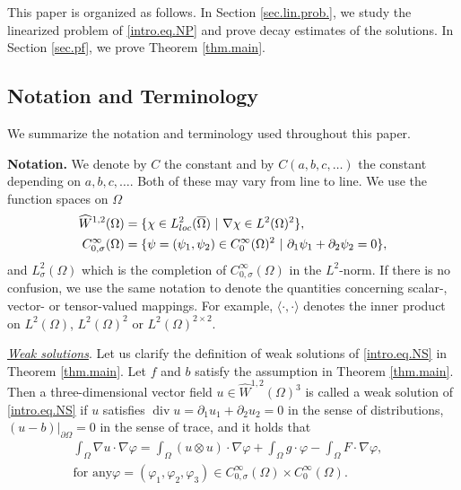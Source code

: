 \documentclass[11pt,a4paper]{article}
\numberwithin{equation}{section}
\newcommand{\opdiv}{\operatorname{div}}
\begin{document}
This paper is organized as follows. In Section \ref{sec.lin.prob.}, we study the linearized problem of \eqref{intro.eq.NP} and prove decay estimates of the solutions. In Section \ref{sec.pf}, we prove Theorem \ref{thm.main}. 


\subsection*{Notation and Terminology}
\label{subsec.sec.intro}


We summarize the notation and terminology used throughout this paper.


\smallskip


\noindent
{\bf Notation.} We denote by $C$ the constant and by $C(a,b,c,\ldots)$ the constant depending on $a,b,c,\ldots$. Both of these may vary from line to line. We use the function spaces on $\Omega$
%
\begin{align*}
\widehat{W}^{1,2}(\Omega)
&=\{\chi\in L^2_{{\rm loc}}(\overline{\Omega})~|~\nabla \chi\in L^2(\Omega)^2\}, \\
C^\infty_{0,\sigma}(\Omega)
&=\{\psi=(\psi_1, \psi_2)\in C^\infty_0(\Omega)^2~|~\partial_1 \psi_1 + \partial_2 \psi_2=0\},
\end{align*}
%
and $L^2_{\sigma}(\Omega)$ which is the completion of $C^\infty_{0,\sigma}(\Omega)$ in the $L^2$-norm. If there is no confusion, we use the same notation to denote the quantities concerning scalar-, vector- or tensor-valued mappings. For example, $\langle \cdot, \cdot\rangle$ denotes the inner product on $L^2(\Omega)$, $L^2(\Omega)^2$ or $L^2(\Omega)^{2\times2}$. 


\smallskip


\noindent
\underline{{\it Weak solutions}}. 
Let us clarify the definition of weak solutions of \eqref{intro.eq.NS} 
in Theorem \ref{thm.main}. Let $f$ and $b$ satisfy the assumption in Theorem \ref{thm.main}. Then a three-dimensional vector field $u\in \widehat{W}^{1,2}(\Omega)^3$ is called a weak solution of \eqref{intro.eq.NS} if $u$ satisfies $\opdiv u=\partial_1 u_1 + \partial_2 u_2=0$ in the sense of distributions, $(u-b)|_{\partial\Omega}=0$ in the sense of trace, and it holds that 
%
\begin{align*}
\int_\Omega \nabla u \cdot \nabla \varphi 
= \int_\Omega (u\otimes u) \cdot \nabla \varphi 
+ \int_\Omega g \cdot \varphi 
- \int_\Omega F \cdot \nabla \varphi, &\\
\text{
for any
$\varphi
=(\varphi_1, \varphi_2, \varphi_3)
\in C^{\infty}_{0,\sigma}(\Omega)\times C^{\infty}_0(\Omega)$.}&
\end{align*}
%
\end{document}
